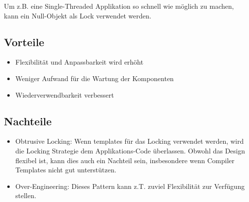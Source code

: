Um z.B. eine Single-Threaded Applikation so schnell wie möglich zu machen, kann ein Null-Objekt als Lock verwendet werden.

\subsection{Vorteile}

\begin{itemize}
	\item Flexibilität und Anpassbarkeit wird erhöht
	\item Weniger Aufwand für die Wartung der Komponenten
	\item Wiederverwendbarkeit verbessert
\end{itemize}

\subsection{Nachteile}

\begin{itemize}
	\item Obtrusive Locking: Wenn templates für das Locking verwendet werden, wird die Locking Strategie dem Applikations-Code überlassen. Obwohl das Design flexibel ist, kann dies auch ein Nachteil sein, insbesondere wenn Compiler Templates nicht gut unterstützen.
	\item Over-Engineering: Dieses Pattern kann z.T. zuviel Flexibilität zur Verfügung stellen.
\end{itemize}

